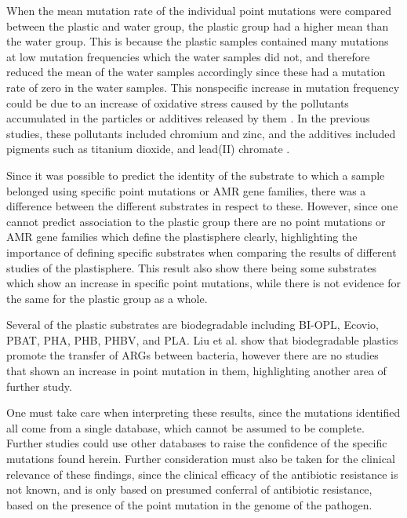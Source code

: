 When the mean mutation rate of the individual point mutations were compared between the plastic and water group, the plastic group had a higher mean than the water group. 
This is because the plastic samples contained many mutations at low mutation frequencies which the water samples did not, and therefore reduced the mean of the water samples accordingly since these had a mutation rate of zero in the water samples.
This nonspecific increase in mutation frequency could be due to an increase of oxidative stress caused by the pollutants accumulated in the particles or additives released by them \cite{forero-lopez2022PlastisphereMicroplasticsSitu, carvajal-garcia2023OxidativeStressDrives}. In the previous studies, these pollutants included chromium and zinc, and the additives included pigments such as titanium dioxide, and lead(II) chromate \cite{liu2020EffectAgingAdsorption}.

Since it was possible to predict the identity of the substrate to which a sample belonged using specific point mutations or AMR gene families, there was a difference between the different substrates in respect to these. 
However, since one cannot predict association to the plastic group there are no point mutations or AMR gene families which define the plastisphere clearly, highlighting the importance of defining specific substrates when comparing the results of different studies of the plastisphere. 
This result also show there being some substrates which show an increase in specific point mutations, while there is not evidence for the same for the plastic group as a whole.


Several of the plastic substrates are biodegradable including BI-OPL, Ecovio, PBAT, PHA, PHB, PHBV, and PLA. Liu et al. \cite{liu2023EffectsComparisonSecondary} show that biodegradable plastics promote the transfer of ARGs between bacteria, however there are no studies that shown an increase in point mutation in them, highlighting another area of further study.

One must take care when interpreting these results, since the mutations identified all come from a single database, which cannot be assumed to be complete. Further studies could use other databases to raise the confidence of the specific mutations found herein. 
Further consideration must also be taken for the clinical relevance of these findings, since the clinical efficacy of the antibiotic resistance is not known, and is only based on presumed conferral of antibiotic resistance, based on the presence of the point mutation in the genome of the pathogen.

